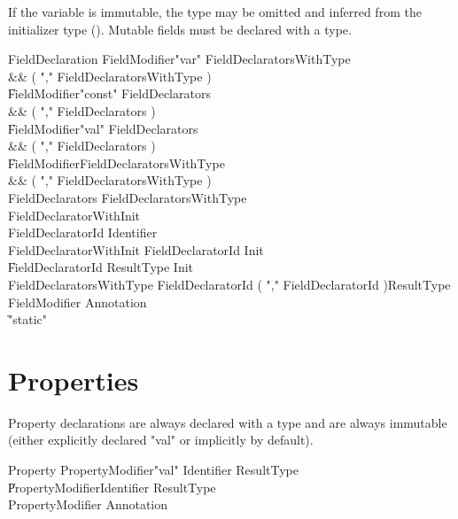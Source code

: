 If the variable is immutable,
the type may be omitted and
inferred from the initializer type ().
Mutable fields must be declared with a type.

\begin{grammar}
FieldDeclaration
        \: FieldModifier\star \xcd"var" FieldDeclaratorsWithType \\&& ( \xcd"," FieldDeclaratorsWithType )\star \\
        \| FieldModifier\star \xcd"const" FieldDeclarators \\&& ( \xcd"," FieldDeclarators )\star \\
        \| FieldModifier\star \xcd"val" FieldDeclarators \\&& ( \xcd"," FieldDeclarators )\star \\
        \| FieldModifier\star FieldDeclaratorsWithType \\&& ( \xcd"," FieldDeclaratorsWithType )\star \\
FieldDeclarators
        \: FieldDeclaratorsWithType \\
        \: FieldDeclaratorWithInit \\
FieldDeclaratorId
        \: Identifier  \\
FieldDeclaratorWithInit
        \: FieldDeclaratorId Init \\
        \| FieldDeclaratorId ResultType Init \\
FieldDeclaratorsWithType
        \: FieldDeclaratorId ( \xcd"," FieldDeclaratorId )\star ResultType \\
FieldModifier \: Annotation \\
                \| \xcd"static" \\
\end{grammar}



\section{Properties}
Property declarations are always declared with a type and are
always immutable (either explicitly declared \xcd"val" or implicitly by default).

\begin{grammar}
Property
        \: PropertyModifier\star \xcd"val" Identifier ResultType \\
        \| PropertyModifier\star Identifier ResultType \\
PropertyModifier \: Annotation \\
\end{grammar}
